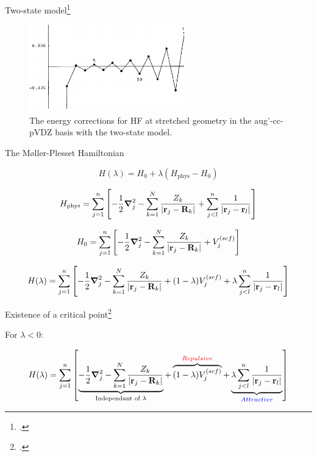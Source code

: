 \documentclass[xcolor=x11names,compress]{beamer}
\renewcommand{\(}{\begin{columns}}
\renewcommand{\)}{\end{columns}}
\newcommand{\<}[1]{\begin{column}{#1}}
\renewcommand{\>}{\end{column}}
\begin{document}
\begin{frame}{Two-state model\footcite{olsen_divergence_2000}}
  
\begin{figure}
    \centering
    \includegraphics[width=0.6\textwidth]{figure-fig14.png}
    \caption{\centering The energy corrections for HF at stretched geometry in the aug'-cc-pVDZ basis with the two-state model.}
    \label{fig:my_label}
\end{figure}

\end{frame}

\begin{frame}{The Møller-Plesset Hamiltonian}

\begin{equation}
H(\lambda)=H_0 + \lambda (H_\text{phys} - H_0)    
\end{equation}

\begin{equation}
    H_\text{phys}=\sum\limits_{j=1}^{n}\left[ -\frac{1}{2}\grad_j^2 - \sum\limits_{k=1}^{N} \frac{Z_k}{|\vb{r}_j-\vb{R}_k|}+\sum\limits_{j<l}^{n}\frac{1}{|\vb{r}_j-\vb{r}_l|}\right]
\end{equation}

\begin{equation}
    H_0=\sum\limits_{j=1}^{n}\left[ -\frac{1}{2}\grad_j^2 - \sum\limits_{k=1}^{N} \frac{Z_k}{|\vb{r}_j-\vb{R}_k|}+V_j^{(scf)}\right]
\end{equation}

\begin{equation*}
    H(\lambda)=\sum\limits_{j=1}^{n}\left[-\frac{1}{2}\grad_j^2 - \sum\limits_{k=1}^{N} \frac{Z_k}{|\vb{r}_j-\vb{R}_k|} + (1-\lambda)V_j^{(scf)}+\lambda\sum\limits_{j<l}^{n}\frac{1}{|\vb{r}_j-\vb{r}_l|} \right]
\end{equation*}
    
\end{frame}

\begin{frame}{Existence of a critical point\footcite{stillinger_mollerplesset_2000}}

For $\lambda<0$:

\begin{equation*}
    H(\lambda)=\sum\limits_{j=1}^{n}\left[ \underbrace{-\frac{1}{2}\grad_j^2 - \sum\limits_{k=1}^{N} \frac{Z_k}{|\vb{r}_j-\vb{R}_k|}}_{\text{Independant of }\lambda} + \overbrace{(1-\lambda)V_j^{(scf)}}^{\textcolor{red}{Repulsive}}+\underbrace{\lambda\sum\limits_{j<l}^{n}\frac{1}{|\vb{r}_j-\vb{r}_l|}}_{\textcolor{blue}{Attractive}}  \right]
\end{equation*}

\end{frame}
\end{document}
